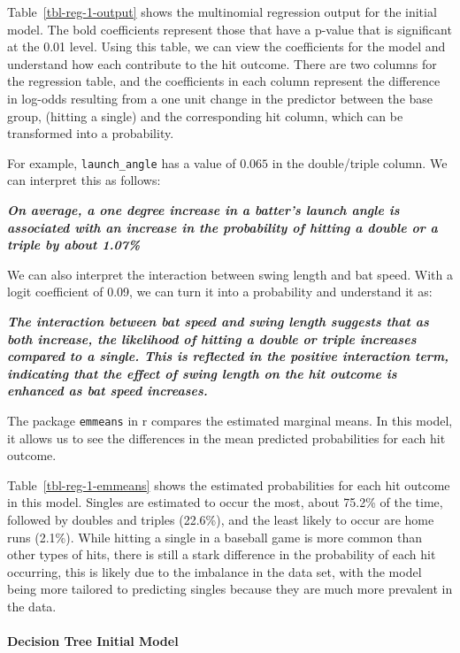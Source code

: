 \documentclass[
  letterpaper,
  DIV=11,
  numbers=noendperiod]{scrartcl}
\let\oldparagraph\paragraph
\renewcommand{\paragraph}[1]{\oldparagraph{#1}\mbox{}}
\begin{document}
Table~\ref{tbl-reg-1-output} shows the multinomial regression output for
the initial model. The bold coefficients represent those that have a
p-value that is significant at the 0.01 level. Using this table, we can
view the coefficients for the model and understand how each contribute
to the hit outcome. There are two columns for the regression table, and
the coefficients in each column represent the difference in log-odds
resulting from a one unit change in the predictor between the base
group, (hitting a single) and the corresponding hit column, which can be
transformed into a probability.

For example, \texttt{launch\_angle} has a value of \(0.065\) in the
double/triple column. We can interpret this as follows:

\textbf{\emph{On average, a one degree increase in a batter's launch
angle is associated with an increase in the probability of hitting a
double or a triple by about 1.07\%}}

We can also interpret the interaction between swing length and bat
speed. With a logit coefficient of 0.09, we can turn it into a
probability and understand it as:

\textbf{\emph{The interaction between bat speed and swing length
suggests that as both increase, the likelihood of hitting a double or
triple increases compared to a single. This is reflected in the positive
interaction term, indicating that the effect of swing length on the hit
outcome is enhanced as bat speed increases.}}

The package \texttt{emmeans} in r compares the estimated marginal means.
In this model, it allows us to see the differences in the mean predicted
probabilities for each hit outcome.

Table~\ref{tbl-reg-1-emmeans} shows the estimated probabilities for each
hit outcome in this model. Singles are estimated to occur the most,
about 75.2\% of the time, followed by doubles and triples (22.6\%), and
the least likely to occur are home runs (2.1\%). While hitting a single
in a baseball game is more common than other types of hits, there is
still a stark difference in the probability of each hit occurring, this
is likely due to the imbalance in the data set, with the model being
more tailored to predicting singles because they are much more prevalent
in the data.

\paragraph{Decision Tree Initial
Model}\label{decision-tree-initial-model}
\end{document}
